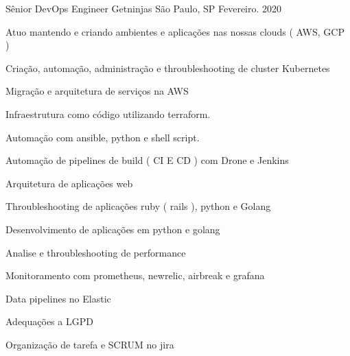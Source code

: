 

\begin{cventries}
\cventry
{Sênior DevOps Engineer} %
{Getninjas} %
{São Paulo, SP} %
{Fevereiro. 2020} %
{
  \begin{cvitems} %
   \item {Atuo mantendo e criando ambientes e aplicações nas nossas clouds ( AWS, GCP ) }
   \item {Criação, automação, administração e throubleshooting de cluster Kubernetes}
   \item {Migração e arquitetura de serviços na AWS}
   \item {Infraestrutura como código utilizando terraform.}
   \item {Automação com ansible, python e shell script.}
   \item {Automação de pipelines de build ( CI E CD ) com Drone e Jenkins}
   \item {Arquitetura de aplicações web}
   \item {Throubleshooting de aplicações ruby ( rails ), python e Golang}
   \item {Desenvolvimento de aplicações em python e golang}
   \item {Analise e throubleshooting de performance}
   \item {Monitoramento com prometheus, newrelic, airbreak e grafana}
   \item {Data pipelines no Elastic}
   \item {Adequações a LGPD}
   \item {Organização de tarefa e SCRUM no jira}
  \end{cvitems}
}


\end{cventries}
